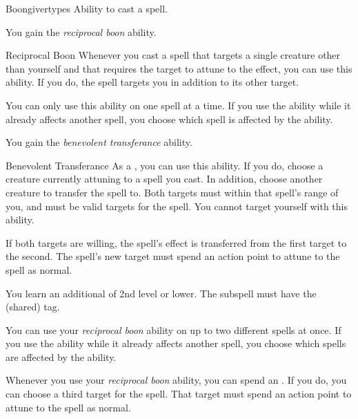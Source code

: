    \begin{feat}{Boongiver}{types}
        \featpre Ability to cast a spell.

         You gain the \textit{reciprocal boon} ability.
        \begin{ability}{Reciprocal Boon}
            Whenever you cast a spell that targets a single creature other than yourself and that requires the target to attune to the effect, you can use this ability.
            If you do, the spell targets you in addition to its other target.

            You can only use this ability on one spell at a time.
            If you use the ability while it already affects another spell, you choose which spell is affected by the ability.
        \end{ability}

         You gain the \textit{benevolent transferance} ability.
        \begin{ability}{Benevolent Transferance}
            As a , you can use this ability.
            If you do, choose a creature currently attuning to a spell you cast.
            In addition, choose another creature to transfer the spell to.
            Both targets must within that spell's range of you, and must be valid targets for the spell.
            You cannot target yourself with this ability.

            If both targets are willing, the spell's effect is transferred from the first target to the second.
            The spell's new target must spend an action point to attune to the spell as normal.
        \end{ability}

         You learn an additional  of 2nd level or lower.
        The subspell must have the  (shared) tag.

         You can use your \textit{reciprocal boon} ability on up to two different spells at once.
        If you use the ability while it already affects another spell, you choose which spells are affected by the ability.

         Whenever you use your \textit{reciprocal boon} ability, you can spend an .
        If you do, you can choose a third target for the spell.
        That target must spend an action point to attune to the spell as normal.


\end{feat}
